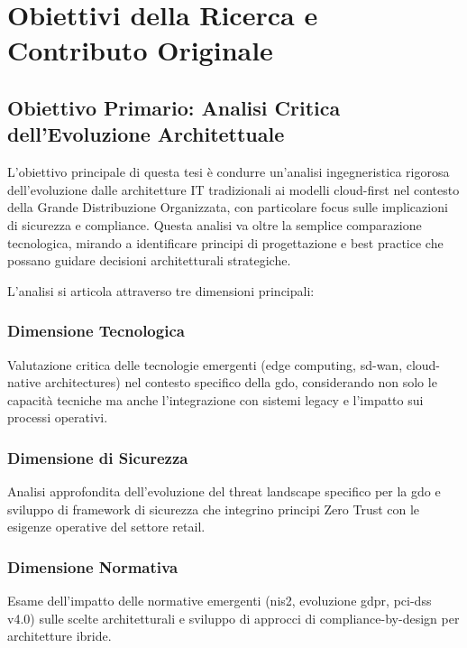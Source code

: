 \section{Obiettivi della Ricerca e Contributo Originale}
\label{sec:obiettivi-ricerca}

\subsection{Obiettivo Primario: Analisi Critica dell'Evoluzione Architettuale}
\label{subsec:obiettivo-primario}

L'obiettivo principale di questa tesi è condurre un'analisi ingegneristica rigorosa dell'evoluzione dalle architetture IT tradizionali ai modelli cloud-first nel contesto della Grande Distribuzione Organizzata, con particolare focus sulle implicazioni di sicurezza e compliance. Questa analisi va oltre la semplice comparazione tecnologica, mirando a identificare principi di progettazione e best practice che possano guidare decisioni architetturali strategiche.

L'analisi si articola attraverso tre dimensioni principali:

\subsubsection{Dimensione Tecnologica}

Valutazione critica delle tecnologie emergenti (edge computing, \gls{sd-wan}, cloud-native architectures) nel contesto specifico della \gls{gdo}, considerando non solo le capacità tecniche ma anche l'integrazione con sistemi legacy e l'impatto sui processi operativi.

\subsubsection{Dimensione di Sicurezza}

Analisi approfondita dell'evoluzione del threat landscape specifico per la \gls{gdo} e sviluppo di framework di sicurezza che integrino principi Zero Trust con le esigenze operative del settore retail.

\subsubsection{Dimensione Normativa}

Esame dell'impatto delle normative emergenti (\gls{nis2}, evoluzione \gls{gdpr}, \gls{pci-dss} v4.0) sulle scelte architetturali e sviluppo di approcci di compliance-by-design per architetture ibride.

